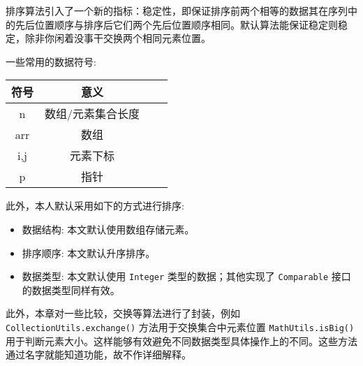 排序算法引入了一个新的指标：稳定性，即保证排序前两个相等的数据其在序列中的先后位置顺序与排序后它们两个先后位置顺序相同。默认算法能保证稳定则稳定，除非你闲着没事干交换两个相同元素位置。

一些常用的数据符号:

\begin{table}[H]
    \centering
    \setlength{\tabcolsep}{4mm}
    \begin{tabular}{c|ccc}
        \toprule
        \textbf{符号} & \textbf{意义} \\
        \midrule
        n & 数组/元素集合长度 \\
        arr & 数组 \\
        i,j & 元素下标 \\
        p & 指针 \\
        \bottomrule
    \end{tabular}
\end{table}

此外，本人默认采用如下的方式进行排序:
\begin{itemize}
    \item 数据结构: 本文默认使用数组存储元素。
    \item 排序顺序: 本文默认升序排序。
    \item 数据类型: 本文默认使用 \texttt{Integer} 类型的数据；其他实现了 \texttt{Comparable} 接口的数据类型同样有效。
\end{itemize}

此外，本章对一些比较，交换等算法进行了封装，例如 \texttt{CollectionUtils.exchange()} 方法用于交换集合中元素位置 \texttt{MathUtils.isBig()} 用于判断元素大小。这样能够有效避免不同数据类型具体操作上的不同。这些方法通过名字就能知道功能，故不作详细解释。